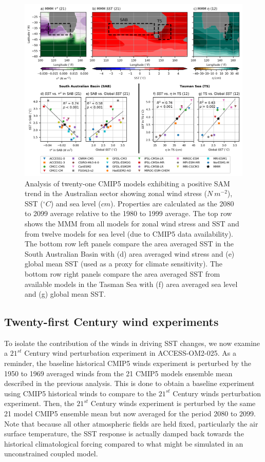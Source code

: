 \documentclass[draft,linenumbers]{agujournal2018}
\begin{document}
\begin{figure}[h]
\centering
\includegraphics[trim={0 0 0 0},clip, width=1\textwidth]{p26_fig2_.png}
\caption{Analysis of twenty-one CMIP5 models exhibiting a positive SAM trend in the Australian sector showing zonal wind stress ($N\ m^{-2}$), SST ($^{\circ}C$) and sea level ($cm$). Properties are calculated as the 2080 to 2099 average relative to the 1980 to 1999 average. The top row shows the MMM from all models for zonal wind stress and SST and from twelve models for sea level (due to CMIP5 data availability). The bottom row left panels compare the area averaged SST in the South Australian Basin with (d) area averaged wind stress and (e) global mean SST (used as a proxy for climate sensitivity). The bottom row right panels compare the area averaged SST from available models in the Tasman Sea with (f) area averaged sea level and (g) global mean SST.}\label{p26_fig1_}
\end{figure}


\subsection{Twenty-first Century wind experiments} \label{Twenty-first Century winds experiment}
To isolate the contribution of the winds in driving SST changes, we now examine a $21^{st}$ Century wind perturbation experiment in ACCESS-OM2-025. As a reminder, the baseline historical CMIP5 winds experiment is perturbed by the 1950 to 1969 averaged winds from the 21 CMIP5 models ensemble mean described in the previous analysis. This is done to obtain a baseline experiment using CMIP5 historical winds to compare to the $21^{st}$ Century winds perturbation experiment. Then, the $21^{st}$ Century winds experiment is perturbed by the same 21 model CMIP5 ensemble mean but now averaged for the period 2080 to 2099. Note that because all other atmospheric fields are held fixed, particularly the air surface temperature, the SST response is actually damped back towards the historical climatological forcing compared to what might be simulated in an unconstrained coupled model.
\end{document}

